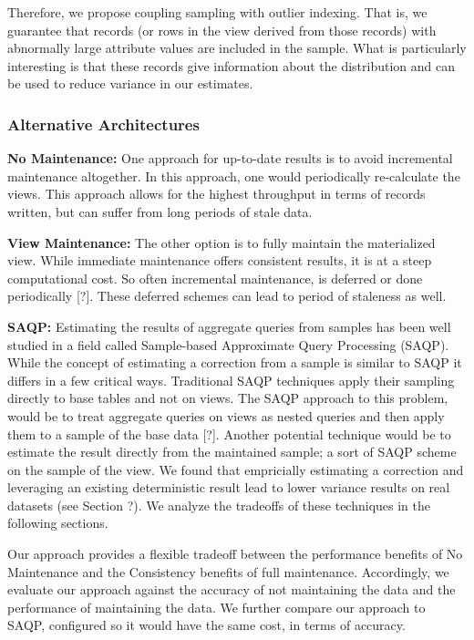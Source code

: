 Therefore, we propose coupling sampling with outlier indexing. 
That is, we guarantee that records (or rows in the view derived from those records) 
with abnormally large attribute values are included in the sample.
What is particularly interesting is that these records give information about the distribution 
and can be used to reduce variance in our estimates.

\subsubsection{Alternative Architectures}
\noindent\textbf{No Maintenance: }
One approach for up-to-date results is to avoid incremental maintenance altogether.
In this approach, one would periodically re-calculate the views.
This approach allows for the highest throughput in terms of records written, but can
suffer from long periods of stale data.

\vspace{1em}

\noindent\textbf{View Maintenance: }
The other option is to fully maintain the materialized view. 
While immediate maintenance offers consistent results, 
it is at a steep computational cost.
So often incremental maintenance, is deferred or done periodically [?].
These deferred schemes can lead to period of staleness as well.

\vspace{1em}

\noindent\textbf{SAQP: }
Estimating the results of aggregate queries from samples has been
well studied in a field called Sample-based Approximate Query Processing
(SAQP). While the concept of estimating a correction from a sample
is similar to SAQP it differs in a few critical ways. Traditional
SAQP techniques apply their sampling directly to base tables and not
on views. The SAQP approach to this problem, would be to treat aggregate
queries on views as nested queries and then apply them to a sample
of the base data {[}?{]}. Another potential technique would be to
estimate the result directly from the maintained sample; a sort of
SAQP scheme on the sample of the view. We found that empricially estimating
a correction and leveraging an existing deterministic result lead
to lower variance results on real datasets (see Section ?). We analyze
the tradeoffs of these techniques in the following sections.

\vspace{1em}

Our approach provides a flexible tradeoff between the performance benefits of No Maintenance and the Consistency benefits of full maintenance. Accordingly, we evaluate our approach against the accuracy of not maintaining the data and the performance of maintaining the data.
We further compare our approach to SAQP, configured so it would have the same cost, in terms of accuracy.